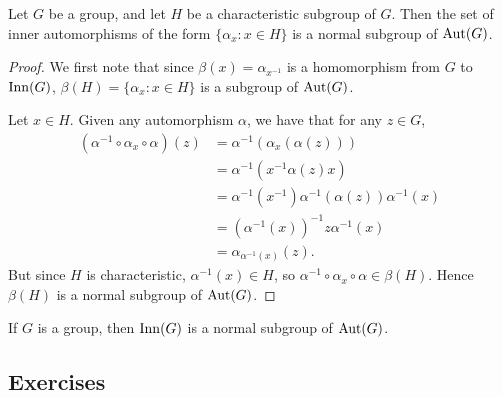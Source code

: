 \begin{theorem}
  Let $G$ be a group, and let $H$ be a characteristic subgroup of $G$.
  Then the set of inner automorphisms of the form $\{\alpha_{x} : x \in H \}$
  is a normal subgroup of $\operatorname{Aut}(G)$.
\end{theorem}
\begin{proof}
  We first note that since $\beta(x) = \alpha_{x^{-1}}$ is a homomorphism
  from $G$ to $\operatorname{Inn}(G)$, $\beta(H) = \{\alpha_{x} : x \in H \}$ is a subgroup
  of $\operatorname{Aut}(G)$.
  
  Let $x \in H$. Given any automorphism $\alpha$, we have that for any
  $z \in G$,
  \begin{align*}
    (\alpha^{-1} \circ \alpha_{x} \circ \alpha)(z)
      &= \alpha^{-1}(\alpha_{x}(\alpha(z)))\\
      &= \alpha^{-1}(x^{-1}\alpha(z)x)\\
      &= \alpha^{-1}(x^{-1})\alpha^{-1}(\alpha(z))\alpha^{-1}(x)\\
      &= (\alpha^{-1}(x))^{-1}z\alpha^{-1}(x)\\
      &= \alpha_{\alpha^{-1}(x)}(z).
  \end{align*}
  But since $H$ is characteristic, $\alpha^{-1}(x) \in H$, so $\alpha^{-1}
  \circ \alpha_{x} \circ \alpha \in \beta(H)$.  Hence $\beta(H)$ is a normal
  subgroup of $\operatorname{Aut}(G)$.
\end{proof}

\begin{corollary}
  If $G$ is a group, then $\operatorname{Inn}(G)$ is a normal subgroup of $\operatorname{Aut}(G)$.
\end{corollary}

\subsection*{Exercises}

